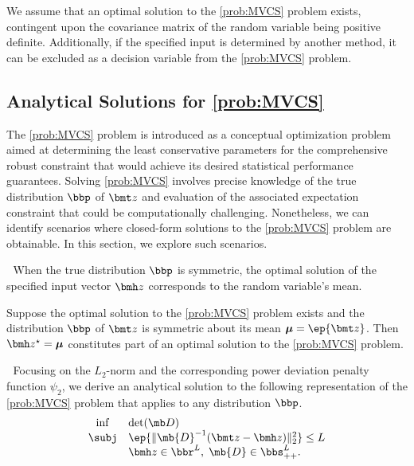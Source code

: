 \documentclass[mnsc, nonblindrev]{informswp}
\newcommand{\1}[1]{\mathds{1}{\left(#1\right)}}
\begin{document}
We assume that an optimal solution to the \ref{prob:MVCS} problem exists, contingent upon the covariance matrix of the random variable being positive definite. Additionally, if the specified input is determined by another method, it can be excluded as a decision variable from the \ref{prob:MVCS} problem.

\subsection{Analytical Solutions for \ref{prob:MVCS}}

The \ref{prob:MVCS} problem is introduced as a conceptual optimization problem aimed at determining the least conservative parameters for the comprehensive robust constraint that would achieve its desired statistical performance guarantees. Solving \ref{prob:MVCS} involves precise knowledge of the true distribution $\bbp$ of $\bmt z$ and evaluation of the associated expectation constraint that could be computationally challenging. Nonetheless, we can identify scenarios where closed-form solutions to the \ref{prob:MVCS} problem are obtainable. In this section, we explore such scenarios.

\medskip
{} $\;$
When the true distribution $\bbp$ is symmetric, the optimal solution of the specified input vector $\bmh z$ corresponds to the random variable's mean. 
\begin{theorem}
\label{chap8:thm:MinVolSolutionSymmetric}
Suppose the optimal solution to the \ref{prob:MVCS} problem exists and the distribution $\bbp$ of $\bmt z$ is symmetric about its mean $\bm \mu = \ep{\bmt z}$. Then $\bmh z^\star=\bm \mu$ constitutes part of an optimal solution to the \ref{prob:MVCS} problem.
\end{theorem}

\medskip
{} $\;$
Focusing on the $L_2$-norm and the corresponding power deviation penalty function $\psi_2$, we derive an analytical solution to the following representation of the \ref{prob:MVCS} problem that applies to any distribution $\bbp$.
\begin{equation}
\label{prob:MVCSESpecial}
\begin{array}{cll}
\inf & \det(\mb D) \\
\subj & \ep{\|\mb{D}^{-1}( \bmt z - \bmh z) \|^2_2} \leq L \\
& \bmh z \in \bbr^L, \; \mb{D} \in \bbs^{L}_{++}.
\end{array} 
\end{equation}
\end{document}
